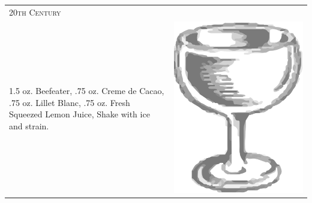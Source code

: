 \documentclass{article}
\begin{document}
\begin{tabular}{p{2in} p{0.5in}}
	\multicolumn{2}{p{3in}}{\centering\Huge\textsc{20th Century}}\\ 
	  \vspace{-0.1in} 1.5 oz. Beefeater, .75 oz. Creme de Cacao, .75 oz. Lillet Blanc, .75 oz. Fresh Squeezed Lemon Juice, Shake with ice and strain. &
	  \vspace{-0.1in} \includegraphics{coupe.png}
\end{tabular}\\
\end{document}
